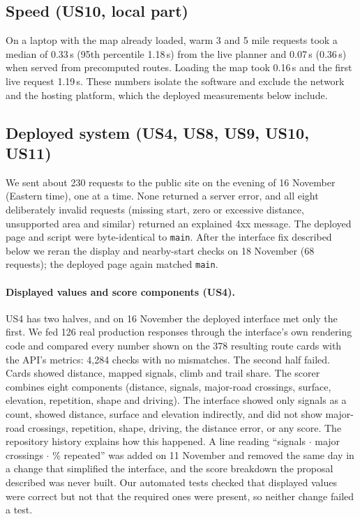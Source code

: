 \subsection{Speed (US10, local part)}
On a laptop with the map already loaded, warm 3 and 5 mile requests took a
median of 0.33\,s (95th percentile 1.18\,s) from the live planner and 0.07\,s
(0.36\,s) when served from precomputed routes. Loading the map took 0.16\,s
and the first live request 1.19\,s. These numbers isolate the software and
exclude the network and the hosting platform, which the deployed measurements
below include.

\subsection{Deployed system (US4, US8, US9, US10, US11)}
We sent about 230 requests to the public site on the evening of 16 November
(Eastern time), one at a
time. None returned a server error, and all eight deliberately invalid
requests (missing start, zero or excessive distance, unsupported area and
similar) returned an explained 4xx message. The deployed page and script were
byte-identical to \texttt{main}. After the interface fix described below we
reran the display and nearby-start checks on 18 November (68 requests); the
deployed page again matched \texttt{main}.

\paragraph{Displayed values and score components (US4).}
US4 has two halves, and on 16 November the deployed interface met only the
first. We fed 126 real production responses through the interface's own
rendering code and compared every number shown on the 378 resulting route
cards with the API's metrics: 4,284 checks with no mismatches. The second half
failed. Cards showed distance, mapped signals, climb and trail share. The
scorer combines eight components (distance, signals, major-road crossings,
surface, elevation, repetition, shape and driving). The interface showed only
signals as a count, showed distance, surface and elevation indirectly, and did
not show major-road crossings, repetition, shape, driving, the distance error,
or any score. The repository history explains how this happened. A line
reading ``signals $\cdot$ major crossings $\cdot$ \% repeated'' was added on
11 November and removed the same day in a change that simplified the
interface, and the score breakdown the proposal described was never built.
Our automated tests checked that displayed values were correct but not that
the required ones were present, so neither change failed a test.

